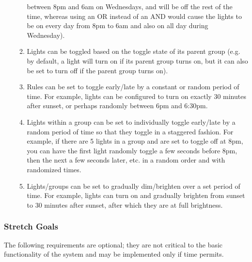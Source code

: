 \begin{enumerate}
\begin{enumerate}
                between 8pm and 6am on Wednesdays, and will be off the rest of
                the time, whereas using an OR instead of an AND would cause the
                lights to be on every day from 8pm to 6am and also on all day
                during Wednesday).
            \item Lights can be toggled based on the toggle state of its parent
                group (e.g. by default, a light will turn on if its parent
                group turns on, but it can also be set to turn off if the
                parent group turns on).
            \item Rules can be set to toggle early/late by a constant or random
                period of time.  For example, lights can be configured to turn
                on exactly 30 minutes after sunset, or perhaps randomly between
                6pm and 6:30pm.
            \item Lights within a group can be set to individually toggle
                early/late by a random period of time so that they toggle in a
                staggered fashion.  For example, if there are 5 lights in a
                group and are set to toggle off at 8pm, you can have the first
                light randomly toggle a few seconds before 8pm, then the next a
                few seconds later, etc. in a random order and with randomized
                times.
            \item Lights/groups can be set to gradually dim/brighten over a set
                period of time.  For example, lights can turn on and gradually
                brighten from sunset to 30 minutes after sunset, after which
                they are at full brightness.
        \end{enumerate}
\end{enumerate}

\subsubsection{Stretch Goals}

The following requirements are optional; they are not critical to the basic
functionality of the system and may be implemented only if time permits.

